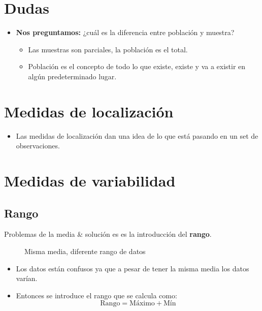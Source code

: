 \section{Dudas}
\begin{itemize}
    \item \textbf{Nos preguntamos:} ¿cuál es la diferencia entre población y muestra?
        \begin{itemize}
            \item Las muestras son parciales, la población es el total.
            \item Población es el concepto de todo lo que existe, existe y va a existir en algún predeterminado lugar.
        \end{itemize}
\end{itemize}


\section{Medidas de localización}
\begin{itemize}
    \item Las medidas de localización dan una idea de lo que está pasando en un set de observaciones.
\end{itemize}


\section{Medidas de variabilidad}

\subsection{Rango}
Problemas de la media \& solución es es la introducción del \textbf{rango}.
\begin{figure}[htbp]
    \centering
    \caption{Misma media, diferente rango de datos}
    \label{}
\end{figure} 
\begin{itemize}
    \item Los datos están confusos ya que a pesar de tener la misma media los datos varían.
    \item Entonces se introduce el rango que se calcula como:
        \[
            \text{Rango} = \text{Máximo} + \text{Mín}
        \]
\end{itemize}

